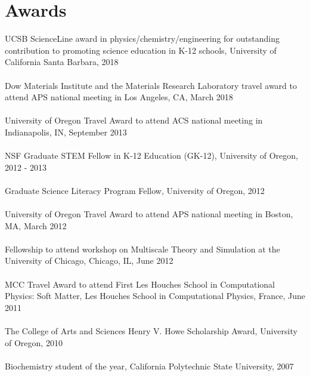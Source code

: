 \documentclass[10pt]{article} %
\begin{document}
\section{Awards} 
UCSB ScienceLine award in physics/chemistry/engineering for outstanding contribution to promoting science education in K-12 schools, University of California Santa Barbara, 2018 \\
\\
Dow Materials Institute and the Materials Research Laboratory travel award to attend APS national meeting in Los Angeles, CA, March 2018 \\
\\
University of Oregon Travel Award to attend ACS national meeting in Indianapolis, IN, September 2013 \\
\\
NSF Graduate STEM Fellow in K-12 Education (GK-12), University of Oregon, 2012 - 2013 \\
\\
Graduate Science Literacy Program Fellow, University of Oregon, 2012  \\
\\
University of Oregon Travel Award to attend APS national meeting in Boston, MA, March 2012 \\
\\
Fellowship to attend workshop on Multiscale Theory and Simulation at the University of Chicago, Chicago, IL, June 2012 \\
\\
MCC Travel Award to attend First Les Houches School in Computational Physics: Soft Matter, Les Houches School in Computational Physics, France, June 2011 \\
\\
The College of Arts and Sciences Henry V. Howe Scholarship Award, University of Oregon, 2010 \\
\\
Biochemistry student of the year, California Polytechnic State University, 2007
\end{document}
